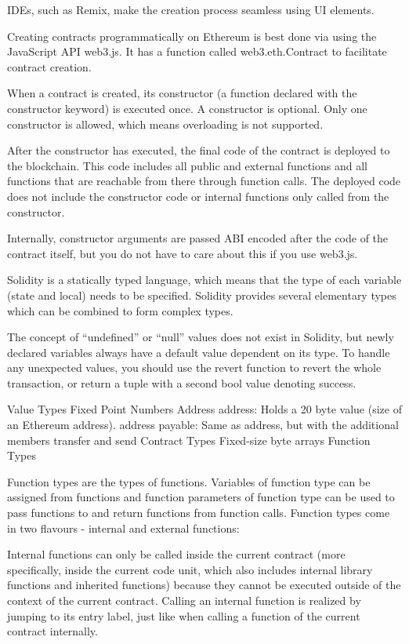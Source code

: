 \documentclass[a4paper]{article}
\begin{document}
IDEs, such as Remix, make the creation process seamless using UI elements.

Creating contracts programmatically on Ethereum is best done via using the JavaScript API web3.js. It has a function called web3.eth.Contract to facilitate contract creation.

When a contract is created, its constructor (a function declared with the constructor keyword) is executed once.
A constructor is optional. Only one constructor is allowed, which means overloading is not supported.

After the constructor has executed, the final code of the contract is deployed to the blockchain. This code includes all public and external functions and all functions that are reachable from there through function calls. The deployed code does not include the constructor code or internal functions only called from the constructor.

Internally, constructor arguments are passed ABI encoded after the code of the contract itself, but you do not have to care about this if you use web3.js\cite{web3_api}.

Solidity is a statically typed language, which means that the type of each variable (state and local) needs to be specified. Solidity provides several elementary types which can be combined to form complex types.

The concept of “undefined” or “null” values does not exist in Solidity, but newly declared variables always have a default value dependent on its type. To handle any unexpected values, you should use the revert function to revert the whole transaction, or return a tuple with a second bool value denoting success.

Value Types
Fixed Point Numbers
Address address: Holds a 20 byte value (size of an Ethereum address).
address payable: Same as address, but with the additional members transfer and send
Contract Types
Fixed-size byte arrays
Function Types

Function types are the types of functions. Variables of function type can be assigned from functions and function parameters of function type can be used to pass functions to and return functions from function calls. Function types come in two flavours - internal and external functions:

Internal functions can only be called inside the current contract (more specifically, inside the current code unit, which also includes internal library functions and inherited functions) because they cannot be executed outside of the context of the current contract. Calling an internal function is realized by jumping to its entry label, just like when calling a function of the current contract internally.
\end{document}
